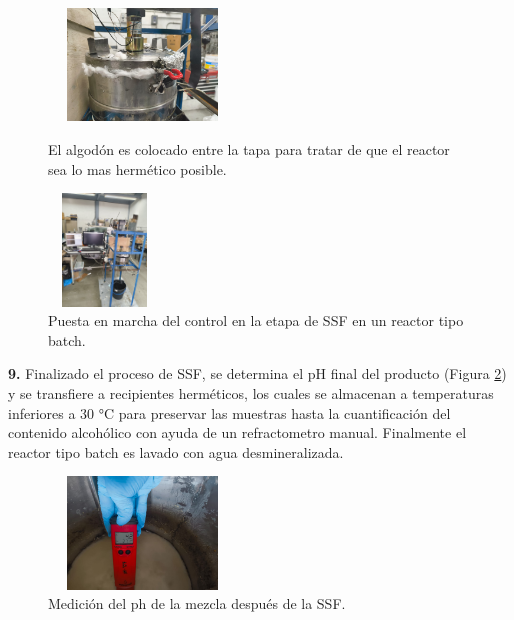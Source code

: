 \documentclass[12pt]{article}
\begin{document}
	 
	     		     \begin{figure}[H]
	     		\centering
	     		\begin{minipage}{0.46\textwidth}
	     			\centering
	     			\includegraphics[width=5cm, height=3cm]{imagenes/hidrolisis 6} %
	     			\caption{ El algodón es colocado entre la tapa para tratar de que el reactor sea lo mas hermético posible. }
	     			\label{hidrolisis  6}
	     		\end{minipage}
	     		\hfill
	     		\begin{minipage}{0.48\textwidth}
	     			\centering
	     			\includegraphics[width=3cm, height=3cm]{imagenes/conexion de hidrolisis } %
	     			\caption{ Puesta en marcha del control en la etapa de SSF en un reactor tipo batch.}
	     			\label{hidrolisis 8}
	     		\end{minipage}
	     	\end{figure}
	     	
	     	
	     	\textbf{9.} Finalizado el proceso de SSF, se determina el pH final del producto (Figura \ref{hidrolisis 7}) y se transfiere a recipientes herméticos, los cuales se almacenan a temperaturas inferiores a 30 °C para preservar las muestras hasta la cuantificación del contenido alcohólico con ayuda de un refractometro manual. Finalmente el reactor tipo batch es lavado con agua desmineralizada.
	     	
	     	
	     		   	\begin{figure}[H]
	     		\centering
	     		\includegraphics[width=5cm, height=3cm]{imagenes/hidrolisis7}
	     		\caption{ Medición del ph de la mezcla después de la SSF.}
	     		\label{hidrolisis 7}
	     	\end{figure}
	     	
\end{document}
